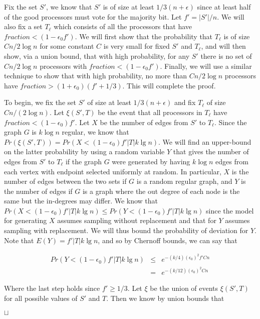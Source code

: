 \documentclass[letterpaper,11pt]{article}
\newcommand{\sq}{\hbox{\rlap{$\sqcap$}$\sqcup$}}
\newcommand{\qed}{\hspace*{\fill}\sq}
\newenvironment{proof}{\noindent {\bf Proof:}}{\qed\par\vskip 4mm\par}
\begin{document}
\begin{proof}
Fix the set $S'$, we know that $S'$ is of size at least $1/3(n + \epsilon)$ since at least half of the good processors must vote for the majority bit.  Let $f' = |S'|/n$. We will also fix a set $T_{\ell}$ which consists of all the processors that have $fraction < (1-\epsilon_{0} f')$.  We will first show that the probability that $T_{\ell}$ is of size $C n/ 2\log n$ for some constant $C$ is very small for fixed $S'$ and $T_{\ell}$, and will then show, via a union bound, that with high probability, for any $S'$ there is no set of $C n/ 2\log n$ processors with $fraction < (1-\epsilon_{0} f')$.  Finally, we will use a similar technique to show that with high probability, no more than $C n/ 2\log n$ processors have $fraction > (1+\epsilon_{0}) (f' + 1/3)$.  This will complete the proof.

To begin, we fix the set $S'$ of size at least $1/3(n + \epsilon)$ and fix $T_{\ell}$ of size $C n/ (2\log n)$.  Let $\xi(S',T)$ be the event that all processors in $T_{\ell}$ have $fraction < (1-\epsilon_{0}) f'$.  Let $X$ be the number of edges from $S'$ to $T_{\ell}$.  Since the graph $G$ is $k \log n$ regular, we know that $Pr(\xi(S',T)) = Pr(X < (1-\epsilon_{0}) f' |T| k \lg n)$.  We will find an upper-bound on the latter probability by using a random variable $Y$ that gives the number of edges from $S'$ to $T_{\ell}$ if the graph $G$ were generated by having $k \log n$ edges from each vertex with endpoint selected uniformly at random.  In particular, $X$ is the number of edges between the two sets if $G$ is a random regular graph, and $Y$ is the number of edges if $G$ is a graph where the out degree of each node is the same but the in-degrees may differ.  We know that $Pr(X < (1-\epsilon_{0}) f' |T| k \lg n) \leq Pr(Y < (1-\epsilon_{0}) f' |T| k \lg n)$ since the model for generating $X$ assumes sampling without replacement and that for $Y$ assumes sampling with replacement.  We will thus bound the probability of deviation for $Y$.  Note that $E(Y) = f' |T| k \lg n$, and so by Chernoff bounds, we can say that 

\begin{eqnarray*}
Pr (Y < (1-\epsilon_{0}) f' |T| k \lg n) & \leq & e^{-(k/4)(\epsilon_{0})^{2} f' C n} \\
& = & e^{-(k/12)(\epsilon_{0})^{2} C n}
\end{eqnarray*}

Where the last step holds since $f' \geq 1/3$.  Let $\xi$ be the union of events $\xi(S',T)$ for all possible values of $S'$ and $T$.  Then we know by union bounds that


\end{proof}
\end{document}
